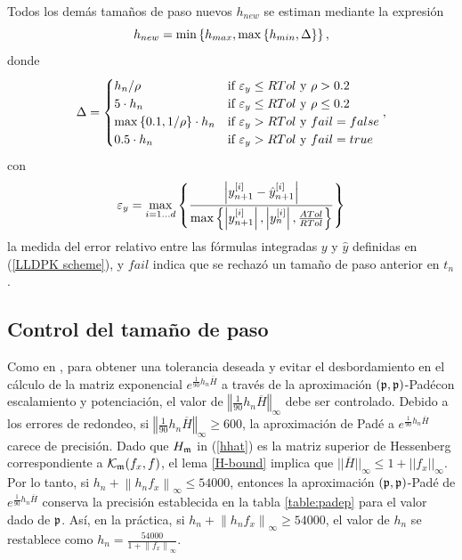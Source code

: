 Todos los demás tamaños de paso nuevos $h_{new}$ se estiman mediante la expresión
\begin{equation}
    h_{new} = \min\left\{ h_{max},\max\left\{ h_{min},\Delta \right\} \right\}, \label{hnewcalc}
\end{equation}
donde
\begin{equation*}
    \Delta = \begin{cases}
        h_n/\rho & \text{if } \varepsilon_y\leq RTol \text{ y } \rho>0\mathord{.}2\\
        5\cdot h_n & \text{if } \varepsilon_y\leq RTol \text{ y } \rho\leq 0\mathord{.}2\\
        \max\left\{ 0\mathord{.}1,1/\rho \right\}\cdot h_n & \text{if } \varepsilon_y > RTol \text{ y } fail=false\\
        0\mathord{.}5\cdot h_n & \text{if } \varepsilon_y > RTol \text{ y } fail=true
        \end{cases},
\end{equation*}
con
\begin{equation}\label{epsilon_y}
	\varepsilon_y =  \max_{i=1\ldots d}\left\{ \frac{\left\lvert y^{[i]}_{n+1}-\hat{y}^{[i]}_{n+1} \right\rvert}
	{\max\left\{ \left\lvert y^{[i]}_{n+1}  \right\rvert,\left\lvert y^{[i]}_{n}\right\rvert,\frac{ATol}{RTol} \right\}} \right\}
\end{equation}
la medida del error relativo entre las fórmulas integradas $y$ y $\hat{y}$ definidas en (\ref{LLDPK scheme}), y $fail$ indica que se rechazó un tamaño de paso anterior en $t_n$.

\subsection{Control del tamaño de paso}\label{secc:hcontrol}
Como en \cite{Jimenez14AMC}, para obtener una tolerancia deseada y evitar el desbordamiento en el cálculo de la matriz exponencial $e^{\frac{1}{90}h_n\overline{H}}$ a través de la aproximación $(\mathfrak{p},\mathfrak{p})$-Pad\'{e}con escalamiento y potenciación, el valor de $\left\Vert \frac{1}{90}h_n\overline{H} \right\Vert_\infty$ debe ser controlado. Debido a los errores de redondeo, si $\left\Vert \frac{1}{90}h_n\overline{H} \right\Vert_\infty \ge 600$, la aproximación de Padé a $e^{\frac{1 }{90}h_n\overline{H}}$ carece de precisión. Dado que $H_{\mathfrak{m}}$ in (\ref{hhat}) es la matriz superior de Hessenberg correspondiente a $\mathcal{K}_{\mathfrak{m}}(f_x,f)$, el lema \ref{H-bound} implica que $|| \overline{H} ||_\infty \leq 1 + || f_x ||_\infty$. Por lo tanto, si $h_n + \left\lVert h_nf_x \right\rVert_\infty \leq 54000$, entonces la aproximación $(\mathfrak{p},\mathfrak{p})$-Padé de $e^{\frac{1}{90}h_n \overline{H}}$ conserva la precisión establecida en la tabla \ref{table:padep} para el valor dado de $\mathfrak{p}$. Así, en la práctica, si $h_n + \left\lVert h_nf_x \right\rVert_\infty \ge 54000$, el valor de $h_n$ se restablece como $h_n=\frac{54000}{1+\left\lVert f_x \right\rVert_\infty}$.

